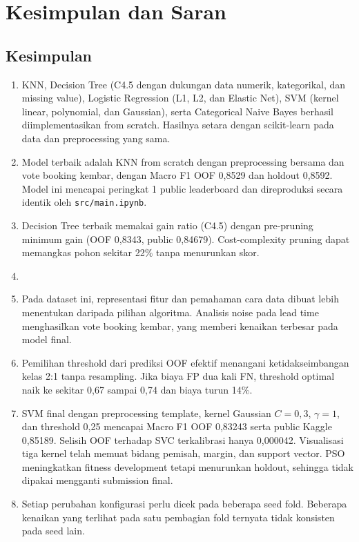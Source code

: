 \chapter{Kesimpulan dan Saran}

\section{Kesimpulan}
\begin{enumerate}
  \item KNN, Decision Tree (C4.5 dengan dukungan data numerik, kategorikal, dan missing value), Logistic Regression (L1, L2, dan Elastic Net), SVM (kernel linear, polynomial, dan Gaussian), serta Categorical Naive Bayes berhasil diimplementasikan from scratch. Hasilnya setara dengan scikit-learn pada data dan preprocessing yang sama.
  \item Model terbaik adalah KNN from scratch dengan preprocessing bersama dan vote booking kembar, dengan Macro F1 OOF 0,8529 dan holdout 0,8592. Model ini mencapai peringkat 1 public leaderboard dan direproduksi secara identik oleh \texttt{src/main.ipynb}.
  \item Decision Tree terbaik memakai gain ratio (C4.5) dengan pre-pruning minimum gain (OOF 0,8343, public 0,84679). Cost-complexity pruning dapat memangkas pohon sekitar 22\% tanpa menurunkan skor.
  \item 
  \item Pada dataset ini, representasi fitur dan pemahaman cara data dibuat lebih menentukan daripada pilihan algoritma. Analisis noise pada lead time menghasilkan vote booking kembar, yang memberi kenaikan terbesar pada model final.
  \item Pemilihan threshold dari prediksi OOF efektif menangani ketidakseimbangan kelas 2:1 tanpa resampling. Jika biaya FP dua kali FN, threshold optimal naik ke sekitar 0,67 sampai 0,74 dan biaya turun 14\%.
  \item SVM final dengan preprocessing template, kernel Gaussian $C=0{,}3$, $\gamma=1$, dan threshold 0,25 mencapai Macro F1 OOF 0,83243 serta public Kaggle 0,85189. Selisih OOF terhadap SVC terkalibrasi hanya 0,000042. Visualisasi tiga kernel telah memuat bidang pemisah, margin, dan support vector. PSO meningkatkan fitness development tetapi menurunkan holdout, sehingga tidak dipakai mengganti submission final.
  \item Setiap perubahan konfigurasi perlu dicek pada beberapa seed fold. Beberapa kenaikan yang terlihat pada satu pembagian fold ternyata tidak konsisten pada seed lain.
\end{enumerate}


